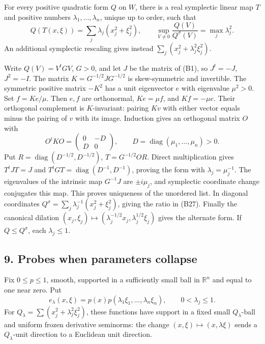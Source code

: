 \documentclass[
  11pt,
]{article}
\begin{document}
For every positive quadratic form \(Q\) on \(W\), there is a real
symplectic linear map \(T\) and positive numbers
\(\lambda_1,\ldots,\lambda_n\), unique up to order, such that \[
 Q(T(x,\xi))=\sum_j\lambda_j(x_j^2+\xi_j^2),
 \qquad \sup_{V\ne0}\frac{Q(V)}{Q^\sigma(V)}=\max_j\lambda_j^2.
 \tag{B27}
\] An additional symplectic rescaling gives instead
\(\sum_j(x_j^2+\lambda_j^2\xi_j^2)\).

Write \(Q(V)=V^tGV\), \(G>0\), and let \(J\) be the matrix of (B1), so
\(J^t=-J\), \(J^2=-I\). The matrix \(K=G^{-1/2}JG^{-1/2}\) is
skew-symmetric and invertible. The symmetric positive matrix \(-K^2\)
has a unit eigenvector \(e\) with eigenvalue \(\mu^2>0\). Set
\(f=Ke/\mu\). Then \(e,f\) are orthonormal, \(Ke=\mu f\), and
\(Kf=-\mu e\). Their orthogonal complement is \(K\)-invariant: pairing
\(Kv\) with either vector equals minus the pairing of \(v\) with its
image. Induction gives an orthogonal matrix \(O\) with \[
 O^tKO=\begin{pmatrix}0&-D\\D&0\end{pmatrix},
 \qquad D=\operatorname{diag}(\mu_1,\ldots,\mu_n)>0.
 \tag{B28}
\] Put \(R=\operatorname{diag}(D^{-1/2},D^{-1/2})\), \(T=G^{-1/2}OR\).
Direct multiplication gives \(T^tJT=J\) and
\(T^tGT=\operatorname{diag}(D^{-1},D^{-1})\), proving the form with
\(\lambda_j=\mu_j^{-1}\). The eigenvalues of the intrinsic map
\(G^{-1}J\) are \(\pm i\mu_j\), and symplectic coordinate change
conjugates this map. This proves uniqueness of the unordered list. In
diagonal coordinates \(Q^\sigma=\sum_j\lambda_j^{-1}(x_j^2+\xi_j^2)\),
giving the ratio in (B27). Finally the canonical dilation
\((x_j,\xi_j)\mapsto(\lambda_j^{-1/2}x_j,\lambda_j^{1/2}\xi_j)\) gives
the alternate form. If \(Q\le Q^\sigma\), each \(\lambda_j\le1\).

\subsection{9. Probes when parameters
collapse}\label{probes-when-parameters-collapse}

Fix \(0\le p\le1\), smooth, supported in a sufficiently small ball in
\(\mathbb R^n\) and equal to one near zero. Put \[
 e_\lambda(x,\xi)=p(x)p(\lambda_1\xi_1,\ldots,\lambda_n\xi_n),
 \qquad 0<\lambda_j\le1.
 \tag{B29}
\] For \(Q_\lambda=\sum(x_j^2+\lambda_j^2\xi_j^2)\), these functions
have support in a fixed small \(Q_\lambda\)-ball and uniform frozen
derivative seminorms: the change \((x,\xi)\mapsto(x,\lambda\xi)\) sends
a \(Q_\lambda\)-unit direction to a Euclidean unit direction.
\end{document}
